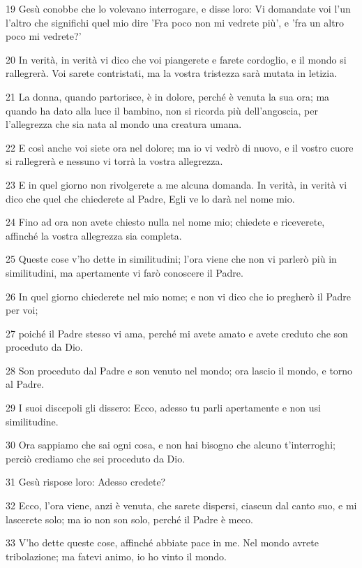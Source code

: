 \par 19 Gesù conobbe che lo volevano interrogare, e disse loro: Vi domandate voi l'un l'altro che significhi quel mio dire 'Fra poco non mi vedrete più', e 'fra un altro poco mi vedrete?'
\par 20 In verità, in verità vi dico che voi piangerete e farete cordoglio, e il mondo si rallegrerà. Voi sarete contristati, ma la vostra tristezza sarà mutata in letizia.
\par 21 La donna, quando partorisce, è in dolore, perché è venuta la sua ora; ma quando ha dato alla luce il bambino, non si ricorda più dell'angoscia, per l'allegrezza che sia nata al mondo una creatura umana.
\par 22 E così anche voi siete ora nel dolore; ma io vi vedrò di nuovo, e il vostro cuore si rallegrerà e nessuno vi torrà la vostra allegrezza.
\par 23 E in quel giorno non rivolgerete a me alcuna domanda. In verità, in verità vi dico che quel che chiederete al Padre, Egli ve lo darà nel nome mio.
\par 24 Fino ad ora non avete chiesto nulla nel nome mio; chiedete e riceverete, affinché la vostra allegrezza sia completa.
\par 25 Queste cose v'ho dette in similitudini; l'ora viene che non vi parlerò più in similitudini, ma apertamente vi farò conoscere il Padre.
\par 26 In quel giorno chiederete nel mio nome; e non vi dico che io pregherò il Padre per voi;
\par 27 poiché il Padre stesso vi ama, perché mi avete amato e avete creduto che son proceduto da Dio.
\par 28 Son proceduto dal Padre e son venuto nel mondo; ora lascio il mondo, e torno al Padre.
\par 29 I suoi discepoli gli dissero: Ecco, adesso tu parli apertamente e non usi similitudine.
\par 30 Ora sappiamo che sai ogni cosa, e non hai bisogno che alcuno t'interroghi; perciò crediamo che sei proceduto da Dio.
\par 31 Gesù rispose loro: Adesso credete?
\par 32 Ecco, l'ora viene, anzi è venuta, che sarete dispersi, ciascun dal canto suo, e mi lascerete solo; ma io non son solo, perché il Padre è meco.
\par 33 V'ho dette queste cose, affinché abbiate pace in me. Nel mondo avrete tribolazione; ma fatevi animo, io ho vinto il mondo.

